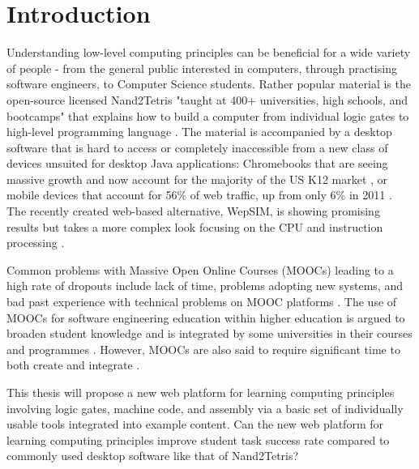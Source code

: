 \chapter{Introduction}
\label{Introduction}



Understanding low-level computing principles can be beneficial for a wide variety of people - from the general public interested in computers, through practising software engineers, to Computer Science students.
Rather popular material is the open-source licensed Nand2Tetris "taught at 400+ universities, high schools, and bootcamps" that explains how to build a computer from individual logic gates to high-level programming language \parencite{nand2tetrisweb}.
The material is accompanied by a desktop software that is hard to access or completely inaccessible from a new class of devices unsuited for desktop Java applications: Chromebooks that are seeing massive growth and now account for the majority of the US K12 market \parencite{Boreham_2019} \parencite{IDC_2021}, or mobile devices that account for 56\% of web traffic, up from only 6\% in 2011 \parencite{StatCounter_2021}.
The recently created web-based alternative, WepSIM, is showing promising results but takes a more complex look focusing on the CPU and instruction processing \parencite{garcia2019wepsim}.

Common problems with Massive Open Online Courses (MOOCs) leading to a high rate of dropouts include lack of time, problems adopting new systems, and bad past experience with technical problems on MOOC platforms \parencite{onah2014dropout}.
The use of MOOCs for software engineering education within higher education is argued to broaden student knowledge and is integrated by some universities in their courses and programmes \parencite{stikkolorum2014mooc}. However, MOOCs are also said to require significant time to both create and integrate \parencite{stikkolorum2014mooc}.

This thesis will propose a new web platform for learning computing principles involving logic gates, machine code, and assembly via a basic set of individually usable tools integrated into example content.
Can the new web platform for learning computing principles improve student task success rate compared to commonly used desktop software like that of Nand2Tetris?
